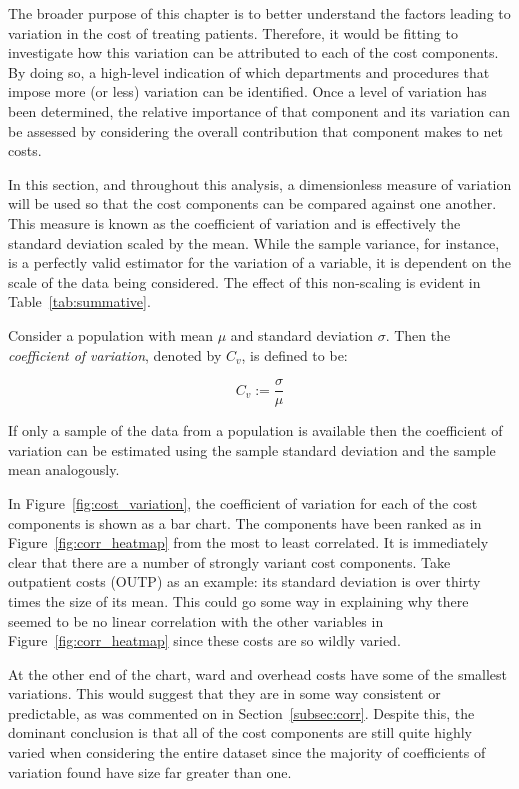 The broader purpose of this chapter is to better understand the factors leading
to variation in the cost of treating patients. Therefore, it would be fitting to
investigate how this variation can be attributed to each of the cost components.
By doing so, a high-level indication of which departments and procedures that
impose more (or less) variation can be identified. Once a level of variation has
been determined, the relative importance of that component and its variation can
be assessed by considering the overall contribution that component makes to net
costs.

In this section, and throughout this analysis, a dimensionless measure of
variation will be used so that the cost components can be compared against one
another. This measure is known as the coefficient of variation and is
effectively the standard deviation scaled by the mean. While the sample
variance, for instance, is a perfectly valid estimator for the variation of a
variable, it is dependent on the scale of the data being considered. The effect
of this non-scaling is evident in Table~\ref{tab:summative}.

\begin{definition}
    Consider a population with mean \(\mu\) and standard deviation \(\sigma\).
    Then the \emph{coefficient of variation}, denoted by \(C_v\), is defined to
    be:

    \[
        C_{v} := \frac{\sigma}{\mu}
    \]

    If only a sample of the data from a population is available then the
    coefficient of variation can be estimated using the sample standard
    deviation and the sample mean analogously.
\end{definition}

In Figure~\ref{fig:cost_variation}, the coefficient of variation for each of the
cost components is shown as a bar chart. The components have been ranked as in
Figure~\ref{fig:corr_heatmap} from the most to least correlated. It is
immediately clear that there are a number of strongly variant cost components.
Take outpatient costs (OUTP) as an example: its standard deviation is over
thirty times the size of its mean. This could go some way in explaining why
there seemed to be no linear correlation with the other variables in
Figure~\ref{fig:corr_heatmap} since these costs are so wildly varied.

At the other end of the chart, ward and overhead costs have some of the smallest
variations. This would suggest that they are in some way consistent or
predictable, as was commented on in Section~\ref{subsec:corr}. Despite this, the
dominant conclusion is that all of the cost components are still quite highly
varied when considering the entire dataset since the majority of coefficients of
variation found have size far greater than one. 

